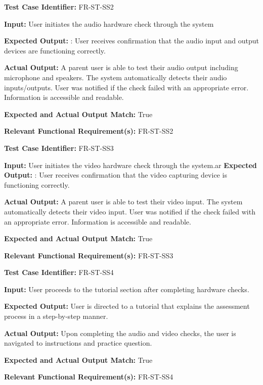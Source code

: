 \documentclass[12pt, titlepage]{article}
\begin{document}
\begin{mdframed}[linewidth=0.5mm] \par
  \textbf{Test Case Identifier:} FR-ST-SS2 \par
  \textbf{Input:} User initiates the audio hardware check through the system \par
  \textbf{Expected Output:} : User receives confirmation that the audio input and output devices are
  functioning correctly. \par
  \textbf{Actual Output:} A parent user is able to test their audio output including microphone and speakers. The system automatically detects their audio inputs/outputs. 
  User was notified if the check failed with an appropriate error. 
  Information is accessible and readable. \par
  \textbf{Expected and Actual Output Match:} True \par
  \textbf{Relevant Functional Requirement(s):} FR-ST-SS2
\end{mdframed}

\begin{mdframed}[linewidth=0.5mm] \par
  \textbf{Test Case Identifier:} FR-ST-SS3 \par
  \textbf{Input:} User initiates the video hardware check through the system.ar
  \textbf{Expected Output:} : User receives confirmation that the video capturing device is functioning
  correctly. \par
  \textbf{Actual Output:} A parent user is able to test their video input. The system automatically detects their video input. 
  User was notified if the check failed with an appropriate error. 
  Information is accessible and readable. \par
  \textbf{Expected and Actual Output Match:} True \par
  \textbf{Relevant Functional Requirement(s):} FR-ST-SS3 
\end{mdframed}


\begin{mdframed}[linewidth=0.5mm] \par
  \textbf{Test Case Identifier:} FR-ST-SS4 \par
  \textbf{Input:} User proceeds to the tutorial section after completing hardware checks.
  \par
  \textbf{Expected Output:} User is directed to a tutorial that explains the assessment process in a
  step-by-step manner. \par
  \textbf{Actual Output:} Upon completing the audio and video checks, the user is navigated to instructions and practice question. \par
  \textbf{Expected and Actual Output Match:} True \par
  \textbf{Relevant Functional Requirement(s):} FR-ST-SS4
\end{mdframed}
\end{document}
